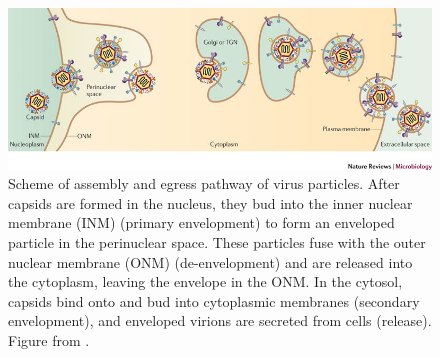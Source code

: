 \begin{figure}
  \includegraphics[width=\textwidth]{./viral_egress}
  \caption{Scheme of assembly and egress pathway of virus particles.
  After capsids are formed in the nucleus, they bud into the inner nuclear membrane (INM) (primary envelopment) to form an enveloped particle in the perinuclear space.
  These particles fuse with the outer nuclear membrane (ONM) (de-envelopment) and are released into the cytoplasm, leaving the envelope in the ONM.
  In the cytosol, capsids bind onto and bud into cytoplasmic membranes (secondary envelopment), and enveloped virions are secreted from cells (release).
  Figure from \cite{[2]}.}
  \label{fig:viral_egress}
\end{figure}

